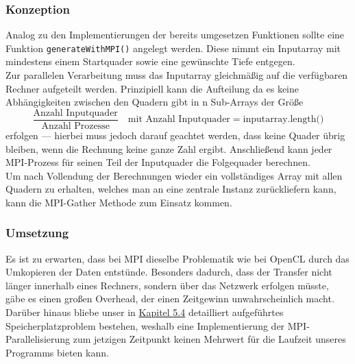 \subsubsection{Konzeption}
\vspace{-0.25cm}
Analog zu den Implementierungen der bereits umgesetzen Funktionen sollte eine Funktion \lstinline{generateWithMPI()}
angelegt werden. Diese nimmt ein Inputarray mit mindestens einem Startquader sowie eine gewünschte Tiefe entgegen.\\
Zur parallelen Verarbeitung muss das Inputarray gleichmäßig auf die verfügbaren Rechner aufgeteilt werden. Prinzipiell kann
die Aufteilung da es keine Abhängigkeiten zwischen den Quadern gibt in n Sub-Arrays der Größe 
\[\frac{\text{Anzahl Inputquader}}{\text{Anzahl Prozesse}}
\quad \text{mit Anzahl Inputquader} = \text{inputarray.length()}
\]
erfolgen --- hierbei muss jedoch darauf geachtet werden, dass keine Quader übrig bleiben, wenn die Rechnung keine ganze Zahl ergibt. 
Anschließend kann jeder MPI-Prozess für seinen Teil der Inputquader die Folgequader berechnen.\\
Um nach Vollendung der Berechnungen wieder ein vollständiges Array mit allen Quadern zu erhalten, welches man an eine zentrale Instanz
zurückliefern kann, kann die MPI-Gather Methode zum Einsatz kommen.

\subsubsection{Umsetzung}
\vspace{-0.25cm}
Es ist zu erwarten, dass bei MPI dieselbe Problematik wie bei OpenCL durch das Umkopieren der Daten entstünde. Besonders dadurch, dass
der Transfer nicht länger innerhalb eines Rechners, sondern über das Netzwerk erfolgen müsste, gäbe es einen großen Overhead, der einen
Zeitgewinn unwahrscheinlich macht.\\
Darüber hinaus bliebe unser in \hyperref[Speicher]{Kapitel 5.4} detailliert aufgeführtes Speicherplatzproblem bestehen, weshalb 
eine Implementierung der MPI-Parallelisierung zum jetzigen Zeitpunkt keinen Mehrwert für die Laufzeit unseres Programms bieten kann.

